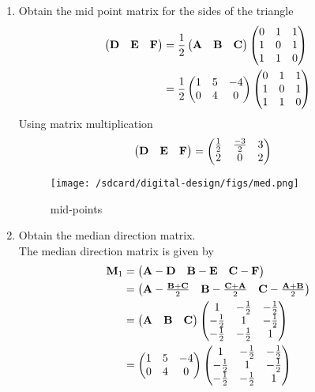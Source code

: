 \documentclass[11pt]{book}
\begin{document}
\begin{enumerate}[label=\thesubsection.\arabic*.,ref=\thesubsection.\theenumi]
\item Obtain the mid point matrix for the sides of the triangle \\
\solution
\begin{align}
\begin{pmatrix}\mathbf{D} & \mathbf{E} &\mathbf{F}\end{pmatrix} &= \frac{1}{2}\begin{pmatrix}\mathbf{A} & \mathbf{B} &\mathbf{C}\end{pmatrix}
\begin{pmatrix}0 & 1 & 1 \\ 1 & 0 & 1 \\ 1 & 1 & 0\end{pmatrix} \\
&= \frac{1}{2}\begin{pmatrix}1 & 5 & -4 \\ 0 & 4 & 0\end{pmatrix}\begin{pmatrix}0 & 1 & 1 \\ 1 & 0 & 1 \\ 1 & 1 & 0\end{pmatrix}
\end{align}
Using matrix multiplication 
\begin{align}
    \begin{pmatrix}\mathbf{D} & \mathbf{E} &\mathbf{F}\end{pmatrix} &= \begin{pmatrix}\frac{1}{2} & \frac{-3}{2} & 3 \\ 2 & 0 & 2\end{pmatrix}
\end{align}
\begin{figure}[H]
    \centering
    \texttt{[image: /sdcard/digital-design/figs/med.png]}
    \caption{mid-points}
    \label{fig:mat_med1}
\end{figure}
\item Obtain the median direction matrix. \\
\solution The median direction matrix is given by 
\begin{align}
			\mathbf{M}_1 &= \begin{pmatrix}\mathbf{A}-\mathbf{D} & \mathbf{B}-\mathbf{E} & \mathbf{C}-\mathbf{F}\end{pmatrix}
			\\
			&= 
			  \begin{pmatrix}
				  \mathbf{A}-\frac{\mathbf{B}+\mathbf{C}}{2} &
			  \mathbf{B}-\frac{\mathbf{C}+\mathbf{A}}{2} &
			  \mathbf{C}-\frac{\mathbf{A}+\mathbf{B}}{2}\end{pmatrix} 
			  \\
			  &= \begin{pmatrix}\mathbf{A} & \mathbf{B} &\mathbf{C}\end{pmatrix}
			  \begin{pmatrix}
				  1 & -\frac{1}{2} & -\frac{1}{2}
				  \\
				  -\frac{1}{2} & 1 & -\frac{1}{2}
				  \\
				  -\frac{1}{2} & -\frac{1}{2} & 1
				  \end{pmatrix} 
      \\
      &= \begin{pmatrix}1 & 5 & -4 \\ 0 & 4 & 0\end{pmatrix}\begin{pmatrix}
				  1 & -\frac{1}{2} & -\frac{1}{2}
				  \\
				  -\frac{1}{2} & 1 & -\frac{1}{2}
				  \\
				  -\frac{1}{2} & -\frac{1}{2} & 1
				  \end{pmatrix} 
		\end{align}

\end{enumerate}
\end{document}
